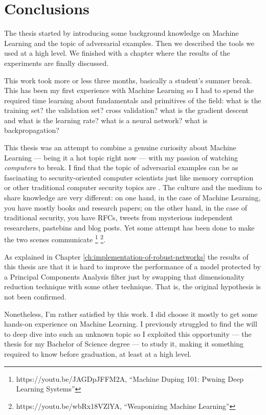 \chapter*{Conclusions}

The thesis started by introducing some background knowledge on Machine
Learning and the topic of adversarial examples. Then we described the
tools we used at a high level. We finished with a chapter where the
results of the experiments are finally discussed.

This work took more or less three months, basically a student's summer
break. This has been my first experience with Machine Learning so I had
to spend the required time learning about fundamentals and primitives
of the field: what is the training set? the validation set? cross
validation? what is the gradient descent and what is the learning rate?
what is a neural network? what is backpropagation?

This thesis was an attempt to combine a genuine curiosity about Machine
Learning --- being it a hot topic right now --- with my passion of
watching \emph{computers} to break. I find that the topic of
adversarial examples can be as fascinating to security-oriented
computer scientists just like memory corruption or other traditional
computer security topics are \cite{DBLP:journals/corr/PapernotMSW16}.
The culture and the medium to share knowledge are very different: on
one hand, in the case of Machine Learning, you have mostly books and
research papers; on the other hand, in the case of traditional
security, you have RFCs, tweets from mysterious independent
researchers, pastebins and blog posts. Yet some attempt has been done
to make the two scenes communicate%
\footnote{https://youtu.be/JAGDpJFFM2A, ``Machine Duping 101: Pwning
  Deep Learning Systems''}
\footnote{https://youtu.be/wbRx18VZlYA, ``Weaponizing Machine
  Learning''}.

As explained in Chapter \ref{ch:implementation-of-robust-networks} the
results of this thesis are that it is hard to improve the performance of
a model protected by a Principal Components Analysis filter just by
swapping that dimensionality reduction technique with some other
technique. That is, the original hypothesis is not been confirmed.

Nonetheless, I'm rather satisfied by this work. I did choose it mostly
to get some hands-on experience on Machine Learning. I previously
struggled to find the will to deep dive into such an unknown topic so I
exploited this opportunity --- the thesis for my Bachelor of Science degree --- to
study it, making it something required to know before graduation, at
least at a high level.
